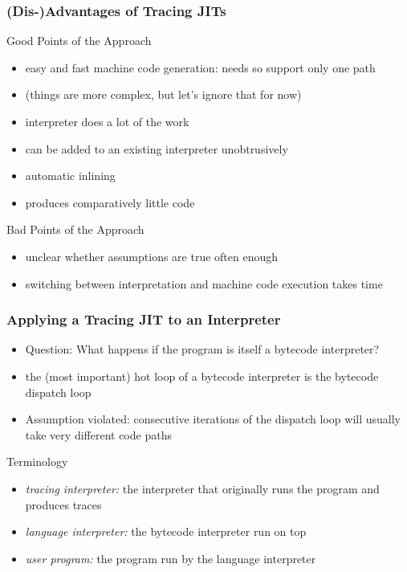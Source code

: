 \documentclass[utf8x]{beamer}
\begin{document}
\begin{frame}
    \frametitle{(Dis-)Advantages of Tracing JITs}
    \begin{block}{Good Points of the Approach}
        \begin{itemize}
        \item easy and fast machine code generation: needs so support only one path
        \item (things are more complex, but let's ignore that for now)
        \item interpreter does a lot of the work
        \item can be added to an existing interpreter unobtrusively
        \item automatic inlining
        \item produces comparatively little code
        \end{itemize}
    \end{block}
    \pause
    \begin{block}{Bad Points of the Approach}
        \begin{itemize}
        \item unclear whether assumptions are true often enough
        \item switching between interpretation and machine code execution takes time
        \end{itemize}
    \end{block}
\end{frame}

\begin{frame}
    \frametitle{Applying a Tracing JIT to an Interpreter}
    \begin{itemize}
    \item Question: What happens if the program is itself a bytecode interpreter?
    \item the (most important) hot loop of a bytecode interpreter is the bytecode dispatch loop
    \item Assumption violated: consecutive iterations of the dispatch loop will usually take very different code paths
    \end{itemize}
    \pause
    \begin{block}{Terminology}
        \begin{itemize}
        \item \emph{tracing interpreter:} the interpreter that originally runs the program and produces traces
        \item \emph{language interpreter:} the bytecode interpreter run on top
        \item \emph{user program:} the program run by the language interpreter
        \end{itemize}
    \end{block}
\end{frame}
\end{document}
